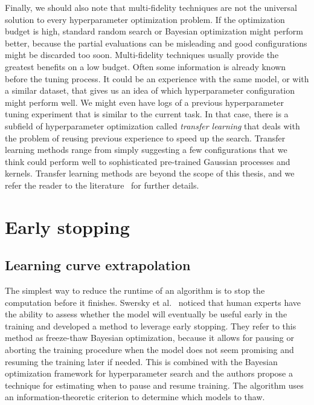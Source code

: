 Finally, we should also note that multi-fidelity techniques are not the universal solution to every hyperparameter optimization problem. If the optimization budget is high, standard random search or Bayesian optimization might perform better, because the partial evaluations can be misleading and good configurations might be discarded too soon. Multi-fidelity techniques usually provide the greatest benefits on a low budget. Often some information is already known before the tuning process. It could be an experience with the same model, or with a similar dataset, that gives us an idea of which hyperparameter configuration might perform well. We might even have logs of a previous hyperparameter tuning experiment that is similar to the current task. In that case, there is a subfield of hyperparameter optimization called \textit{transfer learning} that deals with the problem of reusing previous experience to speed up the search. Transfer learning methods range from simply suggesting a few configurations that we think could perform well to sophisticated pre-trained Gaussian processes and kernels. Transfer learning methods are beyond the scope of this thesis, and we refer the reader to the literature~\cite{bardenet2013collaborative, yogatama2014efficient,perrone2018scalable} for further details.



\section{Early stopping}

\subsection{Learning curve extrapolation}
The simplest way to reduce the runtime of an algorithm is to stop the computation before it finishes. Swersky et al.~\cite{swersky2014freeze} noticed that human experts have the ability to assess whether the model will eventually be useful early in the training and developed a method to leverage early stopping. They refer to this method as freeze-thaw Bayesian optimization, because it allows for pausing or aborting the training procedure when the model does not seem promising and resuming the training later if needed. This is combined with the Bayesian optimization framework for hyperparameter search and the authors propose a technique for estimating when to pause and resume training. The algorithm uses an information-theoretic criterion to determine which models to thaw.

